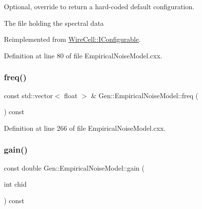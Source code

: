 Optional, override to return a hard-\/coded default configuration. 

The file holding the spectral data 

Reimplemented from \hyperlink{class_wire_cell_1_1_i_configurable_a54841b2da3d1ea02189478bff96f7998}{Wire\+Cell\+::\+I\+Configurable}.



Definition at line 80 of file Empirical\+Noise\+Model.\+cxx.

\mbox{\label{class_wire_cell_1_1_gen_1_1_empirical_noise_model_a10ae08668a26ca0818608a4d653dea1c}} 
\subsubsection{\texorpdfstring{freq()}{freq()}}
{\footnotesize\ttfamily const std\+::vector$<$ float $>$ \& Gen\+::\+Empirical\+Noise\+Model\+::freq (\begin{DoxyParamCaption}{ }\end{DoxyParamCaption}) const\hspace{0.3cm}{\ttfamily [virtual]}}



Definition at line 266 of file Empirical\+Noise\+Model.\+cxx.

\mbox{\label{class_wire_cell_1_1_gen_1_1_empirical_noise_model_a783b81a925de0823c63ade8b242033e8}} 
\subsubsection{\texorpdfstring{gain()}{gain()}}
{\footnotesize\ttfamily const double Gen\+::\+Empirical\+Noise\+Model\+::gain (\begin{DoxyParamCaption}\item[{int}]{chid }\end{DoxyParamCaption}) const\hspace{0.3cm}{\ttfamily [virtual]}}



